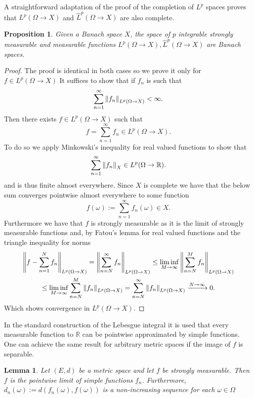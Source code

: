 \documentclass[12pt]{article}
\newcommand{\R}{{\mathbb R}}
\newtheorem{proposition}{Proposition}
\newtheorem{lemma}{Lemma}
\begin{document}
A straightforward adaptation of the proof of the completion of $L^p$ spaces proves that $L^p(\Omega\to X)$ and $\hat{L}^p(\Omega\to X)$ are also complete.
\begin{proposition}
	Given a Banach space $X$, the space of $p$ integrable strongly measurable and measurable functions $L^p(\Omega\to X),\hat{L}^p(\Omega\to X)$ are Banach spaces.
\end{proposition}
\begin{proof}
	The proof is identical in both cases so we prove it only for $f\in L^p(\Omega\to X)$
	It suffices to show that if $f_n$ is such that
	\begin{equation*}
		\sum_{n=1}^\infty \norm{f_n}_{L^p(\Omega\to X)}<\infty.
	\end{equation*}
	Then there exists $f\in L^p(\Omega\to X)$ such that
	\begin{equation*}
		f=\sum_{n=1}^\infty f_n\in L^p(\Omega\to X).
	\end{equation*}
	To do so we apply Minkowski's inequality for real valued functions to show that
	\begin{equation*}
		\sum_{n=1}^\infty \norm{f_n}_X\in L^p(\Omega\to\R).
	\end{equation*}
	and is thus finite almost everywhere. Since $X$ is complete we have that the below sum converges pointwise almost everywhere to some function
	\begin{equation*}
		f(\omega):=\sum_{n=1}^\infty f_n(\omega)\in X.
	\end{equation*}
	Furthermore we have that $f$ is strongly measurable as it is the limit of strongly measurable functions and, by Fatou's lemma for real valued functions and the triangle inequality for norms
	\begin{multline*}
		\norm{f-\sum_{n=1}^N f_n}_{L^p(\Omega\to X)}=\norm{\sum_{n=N}^\infty f_n}_{L^p(\Omega\to X)}\leq \liminf_{M\to \infty}\norm{\sum_{n=N}^M f_n}_{L^p(\Omega\to X)}\\\leq \liminf_{M\to \infty}\sum_{n=N}^M \norm{f_n}_{L^p(\Omega\to X)}=\sum_{n=N}^\infty \norm{f_n}_{L^p(\Omega\to X)}\xrightarrow{N\to\infty} 0.
	\end{multline*}
	Which shows convergence in $L^p(\Omega\to X)$.
\end{proof}
In the standard construction of the Lebesgue integral it is used that every measurable function to $\mathbb{R}$ can be pointwise approximated by simple functions. One can achieve the same result for arbitrary metric spaces if the image of $f$ is separable.
\begin{lemma}
	Let $(E,d)$ be a metric space and let $f$ be strongly measurable. Then $f$ is the pointwise limit of simple functions $f_n$. Furthermore, \\$d_n(\omega):=d(f_n(\omega),f(\omega))$ is a non-increasing sequence for each $\omega\in\Omega$
\end{lemma}
\end{document}
